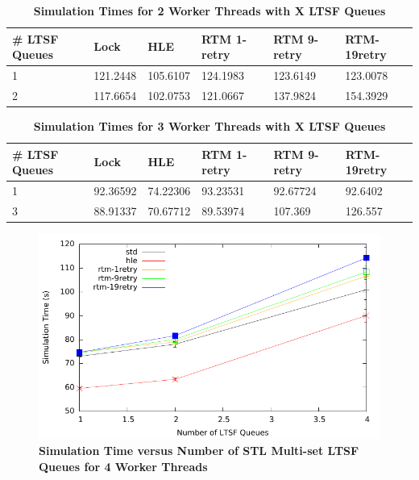 \documentclass[11pt]{book}
\begin{document}
\begin{table}[H]
    \centering
    \begin{tabular}{l|p{2cm}|p{2cm}|p{2cm}|p{2cm}|p{2cm}}
        \textbf{\# LTSF Queues}&Lock &HLE &RTM 1-retry &RTM 9-retry &RTM-19retry \\
        \hline
        \midrule
            1 &121.2448  &105.6107 &124.1983  &123.6149 &123.0078 \\ 
            2 &117.6654  &102.0753 &121.0667  &137.9824 &154.3929 \\
    \end{tabular}
    \caption{\textbf{Simulation Times for 2 Worker Threads with X LTSF Queues}}
    \label{tab:xThrMig_2threadsXschq}
\end{table}

\begin{table}[H]
    \centering
    \begin{tabular}{l|p{2cm}|p{2cm}|p{2cm}|p{2cm}|p{2cm}}
        \textbf{\# LTSF Queues}&Lock &HLE &RTM 1-retry &RTM 9-retry &RTM-19retry \\
        \hline
        \midrule
            1 &92.36592  &74.22306 &93.23531  &92.67724 &92.6402 \\ 
            3 &88.91337  &70.67712 &89.53974  &107.369  &126.557 \\
    \end{tabular}
    \caption{\textbf{Simulation Times for 3 Worker Threads with X LTSF Queues}}
    \label{tab:xThrMig_3threadsXschq}
\end{table}

\begin{figure}[H]
    \centering
    \graphicspath{ {./figures/} }
    \includegraphics[width=\textwidth,height=\textheight,keepaspectratio]{xThrMig-hugeEpidemicSim-timeVSschedQs-multiset-4thread}
    \caption{\textbf{Simulation Time versus Number of STL Multi-set LTSF Queues
    for 4 Worker Threads}}
    \label{fig:xThrMig_timeVSschq_4threads}
\end{figure}
\end{document}
